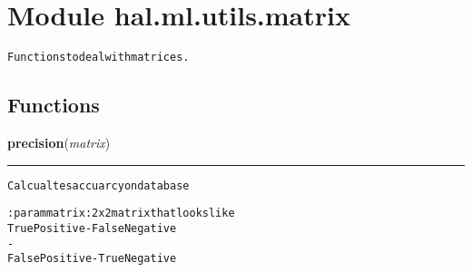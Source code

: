 %
%
%


\section{Module hal.ml.utils.matrix}

    \label{hal:ml:utils:matrix}
\begin{alltt}
Functions to deal with matrices. 
\end{alltt}



  \subsection{Functions}

    \label{hal:ml:utils:matrix:precision}

    \vspace{0.5ex}

\hspace{.8\funcindent}\begin{boxedminipage}{\funcwidth}

    \raggedright \textbf{precision}(\textit{matrix})

    \vspace{-1.5ex}

    \rule{\textwidth}{0.5\fboxrule}
\setlength{\parskip}{2ex}
\begin{alltt}
Calcualtes accuarcy on database

:param matrix: 2x2 matrix that looks like
True Positive  - False Negative
     {\textbar}         -       {\textbar}
False Positive - True Negative
\end{alltt}

\setlength{\parskip}{1ex}
    \end{boxedminipage}


